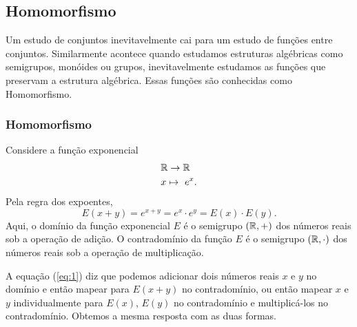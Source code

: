 \subsection{Homomorfismo}

Um estudo de conjuntos inevitavelmente cai para um estudo de funções entre conjuntos. Similarmente acontece quando estudamos estruturas algébricas como semigrupos, monóides ou grupos, inevitavelmente estudamos as funções que preservam a estrutura algébrica. Essas funções são conhecidas como Homomorfismo.
\subsubsection{Homomorfismo}
Considere a função exponencial
\begin{alignat}{2}
  &\mathbb{R} \to \mathbb{R} \nonumber\\
  &x \mapsto\ e^{x}.
  \nonumber
\end{alignat}
Pela regra dos expoentes,
\begin{equation}\label{eq:1}
  E(x+y)=e^{x+y} = e^{x}\cdot e^{y} = E(x)\cdot E(y).  
\end{equation}
Aqui, o domínio da função exponencial $E$ é o semigrupo $(\mathbb{R},+)$ dos números reais sob a operação de adição. O contradomínio da função $E$ é o semigrupo $(\mathbb{R},\cdot)$ dos números reais sob a operação de multiplicação.

A equação (\ref{eq:1}) diz que podemos adicionar dois números reais $x$ e $y$ no domínio e então mapear para $E(x+y)$ no contradomínio, ou então mapear $x$ e $y$ individualmente para $E(x)$, $E(y)$ no contradomínio e multiplicá-los no contradomínio. Obtemos a mesma resposta com as duas formas.

